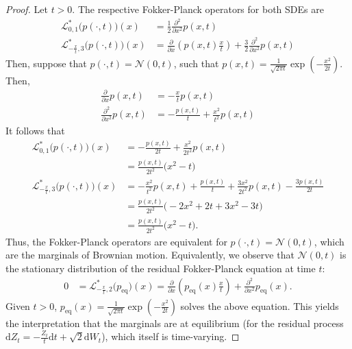 \documentclass[twoside]{article}
\newcommand{\dt}{\mathrm{d}t}
\newcommand{\dWt}{\mathrm{d}W_t}
\begin{document}
\begin{proof}
Let $t>0$. The respective Fokker-Planck operators for both SDEs are
\begin{align*}
   \mathcal{L}^*_{0, 1}\bigl(p(\cdot, t)\bigr)(x) &= \frac{1}{2}\frac{\partial^2}{\partial x^2} p(x,t) \\
   \mathcal{L}^*_{-\frac{x}{t}, 3}\bigl(p(\cdot, t)\bigr)(x)&= \frac{\partial}{\partial x}\left(p(x,t) \frac{x}{t}\right) + \frac{3}{2}\frac{\partial^2}{\partial x^2}p(x,t)
\end{align*}
Then, suppose that $p(\cdot, t)=\mathcal{N}(0,t)$, such that $p(x,t) = \frac{1}{\sqrt{2\pi t}} \exp(-\frac{x^2}{2t})$. Then,
\begin{align*}
    \frac{\partial}{\partial x}p(x,t) &= -\frac{x}{t}p(x,t) \\
    \frac{\partial^2}{\partial x^2}p(x,t) &= -\frac{p(x,t)}{t} + \frac{x^2}{t^2}p(x,t)
\end{align*}
It follows that
\begin{align*}
    \mathcal{L}^*_{0, 1}\bigl(p(\cdot, t)\bigr)(x)&=  -\frac{p(x,t)}{2t} + \frac{x^2}{2t^2}p(x,t)\\
    &= \frac{p(x,t)}{2t^2}\bigl(x^2-t \bigr)\\
   \mathcal{L}^*_{-\frac{x}{t}, 3}\bigl(p(\cdot, t)\bigr)(x)&= 
   -\frac{x^2}{t^2}p(x,t) + \frac{p(x,t)}{t} + \frac{3x^2}{2t^2}p(x,t) - \frac{3p(x,t)}{2t}\\
   &= \frac{p(x,t)}{2t^2}\bigl(-2x^2+2t+3x^2 -3t \bigr)\\
   &= \frac{p(x,t)}{2t^2}\bigl(x^2-t\bigr).
\end{align*}
Thus, the Fokker-Planck operators are equivalent for $p(\cdot, t) = \mathcal{N}(0,t)$, which are the marginals of Brownian motion. Equivalently, we observe that $\mathcal{N}(0,t)$ is the stationary distribution of the residual Fokker-Planck equation at time $t$:
\begin{align*}
   0 &= \mathcal{L}^*_{-\frac{x}{t}, 2}\bigl(p_\mathrm{eq}\bigr)(x)= \frac{\partial}{\partial x}\left(p_\mathrm{eq}(x) \frac{x}{t}\right) +\frac{\partial^2}{\partial x^2}p_\mathrm{eq}(x).
\end{align*}
Given $t>0$, $p_\mathrm{eq}(x) = \frac{1}{\sqrt{2\pi t}} \exp(-\frac{x^2}{2t})$ solves the above equation. This yields the interpretation that the marginals are at equilibrium (for the residual process  $\mathrm{d}Z_t = -\frac{Z_t}{t}\dt{} + \sqrt{2}\dWt{}$), which itself is time-varying.
\end{proof}
\end{document}
